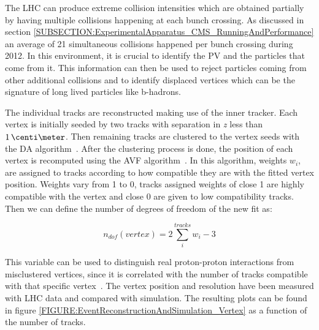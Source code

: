 
The \gls{LHC} can produce extreme collision intensities which are obtained partially by having multiple collisions happening at each bunch crossing. As discussed in section \ref{SUBSECTION:ExperimentalApparatus_CMS_RunningAndPerformance} an average of 21 simultaneous collisions happened per bunch crossing during 2012. In this environment, it is crucial to identify the \gls{PV} and the particles that come from it. This information can then be used to reject particles coming from other additional collisions and to identify displaced vertices which can be the signature of long lived particles like b-hadrons.

The individual tracks are reconstructed making use of the inner tracker. Each vertex is initially seeded by two tracks with separation in \textit{z} less than $1\,\centi\meter$. Then remaining tracks are clustered to the vertex seeds with the \gls{DA} algorithm~\cite{ARTICLE:DeterministicAnnealing}. After the clustering process is done, the position of each vertex is recomputed using the \gls{AVF} algorithm~\cite{ARTICLE:AdaptiveVertexFitting}. In this algorithm, weights $w_{i}$, are assigned to tracks according to how compatible they are with the fitted vertex position. Weights vary from 1 to 0, tracks assigned weights of close 1 are highly compatible with the vertex and close 0 are given to low compatibility tracks. Then we can define the number of degrees of freedom of the new fit as:

\begin{equation}
n_{dof}(vertex)=2\sum\limits_{i}^{tracks} w_i - 3
\end{equation}

This variable can be used to distinguish real proton-proton interactions from misclustered vertices, since it is correlated with the number of tracks compatible with that specific vertex~\cite{ARTICLE:CMSTrackingAndPrimaryVertex}. The vertex position and resolution have been measured with \gls{LHC} data and compared with simulation. The resulting plots can be found in figure \ref{FIGURE:EventReconstructionAndSimulation_Vertex} as a function of the number of tracks.

